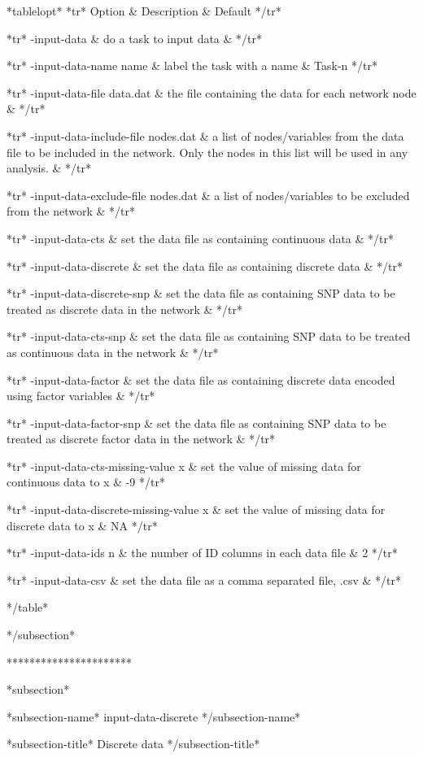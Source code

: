 *tablelopt* *tr* Option & Description & Default */tr*

*tr*
 -input-data  & do a task to input data  &
*/tr*

*tr*
  -input-data-name name & label the task with a name & Task-n
*/tr*

*tr*
  -input-data-file data.dat & the file containing the data for each network node &
*/tr*

*tr*
  -input-data-include-file nodes.dat & a list of nodes/variables from the data file to be included in the network. Only the nodes in this list will be used in any analysis. &
*/tr*

*tr*
  -input-data-exclude-file nodes.dat & a list of nodes/variables to be excluded from the network &
*/tr*

*tr*
  -input-data-cts & set the data file as containing continuous data &
*/tr*

*tr*
  -input-data-discrete & set the data file as containing discrete data &
*/tr*

*tr*
  -input-data-discrete-snp & set the data file as containing SNP data to be treated as discrete data in the network &
*/tr*

*tr*
  -input-data-cts-snp & set the data file as containing SNP data to be treated as continuous data in the network &
*/tr*

*tr* -input-data-factor & set the data file as containing discrete data encoded using factor variables & */tr*

*tr* -input-data-factor-snp & set the data file as containing SNP data to be treated as discrete factor data in the network & */tr*

*tr*
  -input-data-cts-missing-value x & set the value of missing data for continuous data to x & -9
*/tr*

*tr*
  -input-data-discrete-missing-value x & set the value of missing data for discrete data to x & NA
*/tr*

*tr*
  -input-data-ids n & the number of ID columns in each data file & 2
*/tr*

*tr* -input-data-csv & set the data file as a comma separated file, .csv & */tr*

*/table*

*/subsection*

**********************

*subsection*

*subsection-name* input-data-discrete */subsection-name*

*subsection-title* Discrete data */subsection-title*

